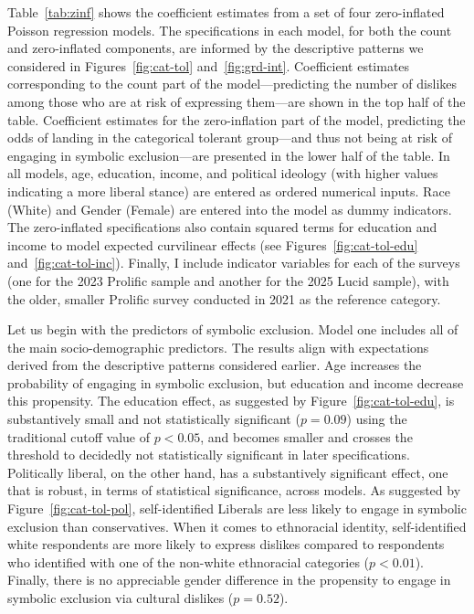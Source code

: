 \documentclass[12pt]{article}
\begin{document}
Table~\ref{tab:zinf} shows the coefficient estimates from a set of four zero-inflated Poisson regression models. The specifications in each model, for both the count and zero-inflated components, are informed by the descriptive patterns we considered in Figures~\ref{fig:cat-tol} and~\ref{fig:grd-int}. Coefficient estimates corresponding to the count part of the model---predicting the number of dislikes among those who are at risk of expressing them---are shown in the top half of the table. Coefficient estimates for the zero-inflation part of the model, predicting the odds of landing in the categorical tolerant group---and thus not being at risk of engaging in symbolic exclusion---are presented in the lower half of the table. In all models, age, education, income, and political ideology (with higher values indicating a more liberal stance) are entered as ordered numerical inputs. Race (White) and Gender (Female) are entered into the model as dummy indicators. The zero-inflated specifications also contain squared terms for education and income to model expected curvilinear effects (see Figures~\ref{fig:cat-tol-edu} and~\ref{fig:cat-tol-inc}). Finally, I include indicator variables for each of the surveys (one for the 2023 Prolific sample and another for the 2025 Lucid sample), with the older, smaller Prolific survey conducted in 2021 as the reference category. 

Let us begin with the predictors of symbolic exclusion. Model one includes all of the main socio-demographic predictors. The results align with expectations derived from the descriptive patterns considered earlier. Age increases the probability of engaging in symbolic exclusion, but education and income decrease this propensity. The education effect, as suggested by Figure~\ref{fig:cat-tol-edu}, is substantively small and not statistically significant ($p = 0.09$) using the traditional cutoff value of $p < 0.05$, and becomes smaller and crosses the threshold to decidedly not statistically significant in later specifications. Politically liberal, on the other hand, has a substantively significant effect, one that is robust, in terms of statistical significance, across models. As suggested by Figure~\ref{fig:cat-tol-pol}, self-identified Liberals are less likely to engage in symbolic exclusion than conservatives. When it comes to ethnoracial identity, self-identified white respondents are more likely to express dislikes compared to respondents who identified with one of the non-white ethnoracial categories ($p < 0.01$). Finally, there is no appreciable gender difference in the propensity to engage in symbolic exclusion via cultural dislikes ($p = 0.52$).
\end{document}
